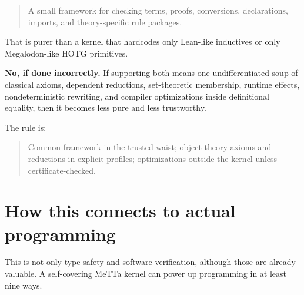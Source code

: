 \documentclass[11pt]{article}
\newcommand{\MeTTa}{\textup{MeTTa}}
\newcommand{\Megalodon}{\textup{Megalodon}}
\newcommand{\HOTG}{\textup{HOTG}}
\begin{document}
\begin{quote}
A small framework for checking terms, proofs, conversions, declarations, imports, and theory-specific rule packages.
\end{quote}

That is purer than a kernel that hardcodes only Lean-like inductives or only \Megalodon{}-like \HOTG{} primitives.

\textbf{No, if done incorrectly.}  If supporting both means one undifferentiated soup of classical axioms, dependent reductions, set-theoretic membership, runtime effects, nondeterministic rewriting, and compiler optimizations inside definitional equality, then it becomes less pure and less trustworthy.

The rule is:

\begin{quote}
Common framework in the trusted waist; object-theory axioms and reductions in explicit profiles; optimizations outside the kernel unless certificate-checked.
\end{quote}

\section{How this connects to actual programming}

This is not only type safety and software verification, although those are already valuable.  A self-covering \MeTTa{} kernel can power up programming in at least nine ways.
\end{document}
